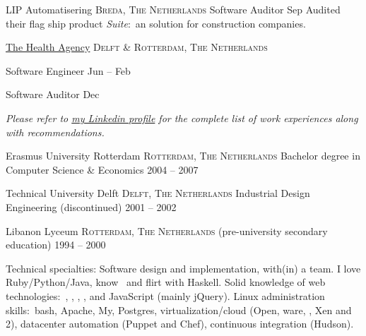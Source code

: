 \documentclass[10pt,a4paper]{article}
\begin{document}
\headedsection
  {LIP Automatisering}
  {\textsc{Breda, The Netherlands}} {%
  \headedsubsection
    {Software Auditor}
    {Sep }
    {\bodytext
      {Audited their flag ship product \emph{ Suite}:\ an  solution for construction companies.}}
}

\headedsection
  {\href{http://www.thehealthagency.com}{The Health Agency}}
  {\textsc{Delft \& Rotterdam, The Netherlands}} {%

  \headedsubsection
    {Software Engineer}
    {Jun  -- Feb }
    {}

  \headedsubsection
    {Software Auditor}
    {Dec }
    {}
}

\begin{center}
  \emph{Please refer to \href{http://www.linkedin.com/in/ciesbreijs}{my Linkedin profile} for the complete list of work experiences along with recommendations.}
\end{center}


\spacedhrule{-0.2em}{-0.4em}


\headedsection
  {Erasmus University Rotterdam}
  {\textsc{Rotterdam, The Netherlands}} {%
  \headedsubsection
    {Bachelor degree in Computer Science \& Economics}
    {2004 -- 2007}
    {}
}

\headedsection
  {Technical University Delft}
  {\textsc{Delft, The Netherlands}} {%
  \headedsubsection
    {Industrial Design Engineering \textnormal{(discontinued)}}
    {2001 -- 2002} {}
}

\headedsection
  {Libanon Lyceum}
  {\textsc{Rotterdam, The Netherlands}} {%
  \headedsubsection
    { \textnormal{(pre-university secondary education)}}
    {1994 -- 2000} {}
}


\spacedhrule{0.3em}{-0.4em}


\inlineheadsection
  {Technical specialties:}
  {Software design and implementation, with(in) a team. I love Ruby/Python/Java, know \CPP~and flirt with Haskell. Solid knowledge of web technologies:\ , , , ,  and JavaScript (mainly jQuery). Linux administration skills:\ bash, Apache, My, Postgres, virtualization/cloud (Open, ware, , Xen and 2), datacenter automation (Puppet and Chef), continuous integration (Hudson).}
\end{document}
